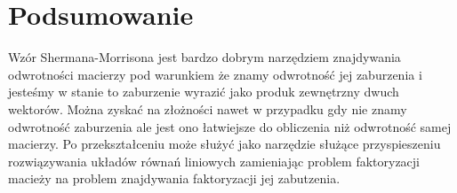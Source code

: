 \documentclass[11pt]{extarticle}
\begin{document}
	\section{Podsumowanie}
	Wzór Shermana-Morrisona jest bardzo dobrym narzędziem znajdywania odwrotności macierzy
	pod warunkiem że znamy odwrotność jej zaburzenia i
	jesteśmy w stanie to zaburzenie wyrazić jako produk zewnętrzny dwuch wektorów.
	Można zyskać na złożności nawet w przypadku gdy nie znamy odwrotność zaburzenia
	ale jest ono łatwiejsze do obliczenia niż odwrotność samej macierzy.
	Po przekształceniu może służyć jako narzędzie służące przyspieszeniu rozwiązywania układów równań liniowych
	zamieniając problem faktoryzacji macieży na problem znajdywania faktoryzacji jej zabutzenia.
\end{document}
